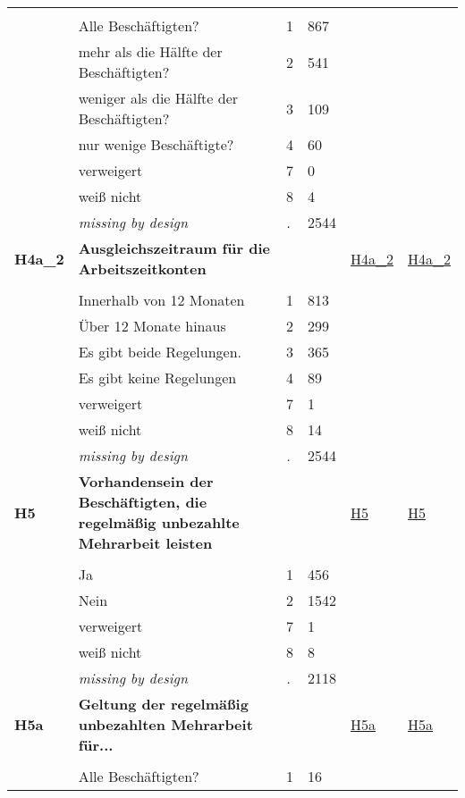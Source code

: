 \begin{longtable}{| L{2.45cm} | L{6cm} | C{1.5cm} | R{1cm} | C{2.25cm} | C{2.25cm} |}
   &  &  &  &  &  \\ 
   & Alle Beschäftigten? & 1 & 867 &  &  \\ 
   & mehr als die Hälfte der Beschäftigten? & 2 & 541 &  &  \\ 
   & weniger als die Hälfte der Beschäftigten? & 3 & 109 &  &  \\ 
   & nur wenige Beschäftigte? & 4 & 60 &  &  \\ 
   & verweigert & 7 & 0 &  &  \\ 
   & weiß nicht & 8 & 4 &  &  \\ 
   & \textit{missing by design} & \textit{.} & 2544 &  &  \\ 
   \midrule
\textbf{H4a\_2}\label{var:H4a:2} & \textbf{Ausgleichszeitraum für die Arbeitszeitkonten} &  &  & \hyperref[H4a:2]{H4a\_2} & \hyperref[var:suf:H4a:2]{H4a\_2} \\ 
   &  &  &  &  &  \\ 
   & Innerhalb von 12 Monaten & 1 & 813 &  &  \\ 
   & Über 12 Monate hinaus & 2 & 299 &  &  \\ 
   & Es gibt beide Regelungen. & 3 & 365 &  &  \\ 
   & Es gibt keine Regelungen & 4 & 89 &  &  \\ 
   & verweigert & 7 & 1 &  &  \\ 
   & weiß nicht & 8 & 14 &  &  \\ 
   & \textit{missing by design} & \textit{.} & 2544 &  &  \\ 
   \midrule
\textbf{H5}\label{var:H5} & \textbf{Vorhandensein der Beschäftigten, die regelmäßig unbezahlte Mehrarbeit leisten} &  &  & \hyperref[H5]{H5} & \hyperref[var:suf:H5]{H5} \\ 
   &  &  &  &  &  \\ 
   & Ja & 1 & 456 &  &  \\ 
   & Nein & 2 & 1542 &  &  \\ 
   & verweigert & 7 & 1 &  &  \\ 
   & weiß nicht & 8 & 8 &  &  \\ 
   & \textit{missing by design} & \textit{.} & 2118 &  &  \\ 
   \midrule
\textbf{H5a}\label{var:H5a} & \textbf{Geltung der regelmäßig unbezahlten Mehrarbeit für...} &  &  & \hyperref[H5a]{H5a} & \hyperref[var:suf:H5a]{H5a} \\ 
   &  &  &  &  &  \\ 
   & Alle Beschäftigten? & 1 & 16 &  &  \\ 

\end{longtable}
